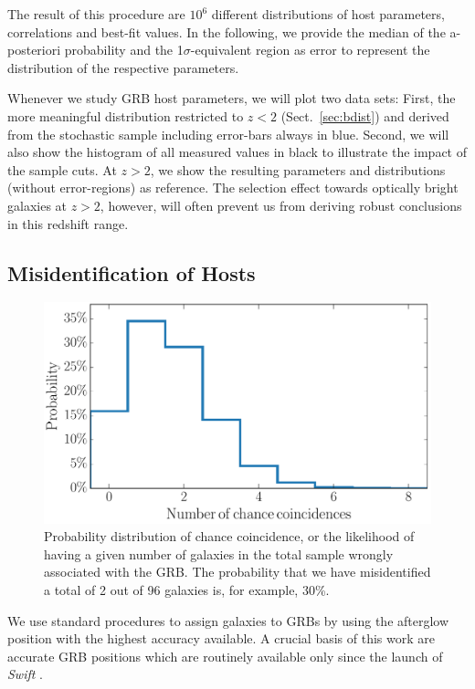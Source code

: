 \documentclass[traditabstract, longauth]{aa}
\begin{document}
 {The result of this procedure are $10^{6}$ different distributions of host parameters, correlations and best-fit values. In the following, we provide the median of the a-posteriori probability and the 1$\sigma$-equivalent region as error to represent the distribution of the respective parameters.}

 {Whenever we study GRB host parameters, we will plot two data sets: First, the more meaningful distribution restricted to $z<2$ (Sect.~\ref{sec:bdist}) and derived from the stochastic sample including error-bars always in blue. Second, we will also show the histogram of all measured values in black to illustrate the impact of the sample cuts. At $z>2$, we show the resulting parameters and distributions (without error-regions) as reference. The selection effect towards optically bright galaxies at $z>2$, however, will often prevent us from deriving robust conclusions in this redshift range.}

\subsection{Misidentification of Hosts}

\begin{figure}
\includegraphics[angle=0, width=0.99\columnwidth]{Figs/Misidentifications.pdf}
\caption{Probability distribution of chance coincidence, or the likelihood of having a given number of galaxies in the total sample wrongly associated with the GRB. The probability that we have misidentified a total of 2 out of 96 galaxies is, for example, 30\%.}
\label{fig:misid}
\end{figure}

We use standard procedures \citep{2002AJ....123.1111B, 2009AJ....138.1690P} to assign galaxies to GRBs by using the afterglow position with the highest accuracy available. A crucial basis of this work are accurate GRB positions which are routinely available only since the launch of \textit{Swift} \citep{2004ApJ...611.1005G, 2005SSRv..120..165B}. 
\end{document}
